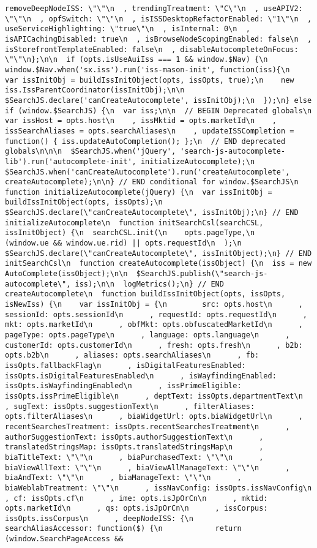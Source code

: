 \documentclass[
]{article}
\begin{document}
\begin{verbatim}
removeDeepNodeISS: \"\"\n  , trendingTreatment: \"C\"\n  , useAPIV2: \"\"\n  , opfSwitch: \"\"\n  , isISSDesktopRefactorEnabled: \"1\"\n  , useServiceHighlighting: \"true\"\n  , isInternal: 0\n  , isAPICachingDisabled: true\n  , isBrowseNodeScopingEnabled: false\n  , isStorefrontTemplateEnabled: false\n  , disableAutocompleteOnFocus: \"\"\n};\n\n  if (opts.isUseAuiIss === 1 && window.$Nav) {\n  window.$Nav.when('sx.iss').run('iss-mason-init', function(iss){\n    var issInitObj = buildIssInitObject(opts, issOpts, true);\n    new iss.IssParentCoordinator(issInitObj);\n\n    $SearchJS.declare('canCreateAutocomplete', issInitObj);\n  });\n} else if (window.$SearchJS) {\n  var iss;\n\n  // BEGIN Deprecated globals\n  var issHost = opts.host\n    , issMktid = opts.marketId\n    , issSearchAliases = opts.searchAliases\n    , updateISSCompletion = function() { iss.updateAutoCompletion(); };\n  // END deprecated globals\n\n\n  $SearchJS.when('jQuery', 'search-js-autocomplete-lib').run('autocomplete-init', initializeAutocomplete);\n  $SearchJS.when('canCreateAutocomplete').run('createAutocomplete', createAutocomplete);\n\n} // END conditional for window.$SearchJS\n  function initializeAutocomplete(jQuery) {\n  var issInitObj = buildIssInitObject(opts, issOpts);\n  $SearchJS.declare(\"canCreateAutocomplete\", issInitObj);\n} // END initializeAutocomplete\n  function initSearchCsl(searchCSL, issInitObject) {\n  searchCSL.init(\n    opts.pageType,\n    (window.ue && window.ue.rid) || opts.requestId\n  );\n  $SearchJS.declare(\"canCreateAutocomplete\", issInitObject);\n} // END initSearchCsl\n  function createAutocomplete(issObject) {\n  iss = new AutoComplete(issObject);\n\n  $SearchJS.publish(\"search-js-autocomplete\", iss);\n\n  logMetrics();\n} // END createAutocomplete\n  function buildIssInitObject(opts, issOpts, isNewIss) {\n    var issInitObj = {\n        src: opts.host\n      , sessionId: opts.sessionId\n      , requestId: opts.requestId\n      , mkt: opts.marketId\n      , obfMkt: opts.obfuscatedMarketId\n      , pageType: opts.pageType\n      , language: opts.language\n      , customerId: opts.customerId\n      , fresh: opts.fresh\n      , b2b: opts.b2b\n      , aliases: opts.searchAliases\n      , fb: issOpts.fallbackFlag\n      , isDigitalFeaturesEnabled: issOpts.isDigitalFeaturesEnabled\n      , isWayfindingEnabled: issOpts.isWayfindingEnabled\n      , issPrimeEligible: issOpts.issPrimeEligible\n      , deptText: issOpts.departmentText\n      , sugText: issOpts.suggestionText\n      , filterAliases: opts.filterAliases\n      , biaWidgetUrl: opts.biaWidgetUrl\n      , recentSearchesTreatment: issOpts.recentSearchesTreatment\n      , authorSuggestionText: issOpts.authorSuggestionText\n      , translatedStringsMap: issOpts.translatedStringsMap\n      , biaTitleText: \"\"\n      , biaPurchasedText: \"\"\n      , biaViewAllText: \"\"\n      , biaViewAllManageText: \"\"\n      , biaAndText: \"\"\n      , biaManageText: \"\"\n      , biaWeblabTreatment: \"\"\n      , issNavConfig: issOpts.issNavConfig\n      , cf: issOpts.cf\n      , ime: opts.isJpOrCn\n      , mktid: opts.marketId\n      , qs: opts.isJpOrCn\n      , issCorpus: issOpts.issCorpus\n      , deepNodeISS: {\n          searchAliasAccessor: function($) {\n            return (window.SearchPageAccess && 
\end{verbatim}
\end{document}
